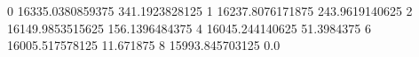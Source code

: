 0 16335.0380859375 341.1923828125
1 16237.8076171875 243.9619140625
2 16149.9853515625 156.1396484375
4 16045.244140625 51.3984375
6 16005.517578125 11.671875
8 15993.845703125 0.0
